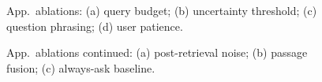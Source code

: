 \documentclass{article}
\begin{document}
\begin{figure}[h]
  \caption{App.\ ablations: (a) query budget; (b) uncertainty threshold; (c) question phrasing; (d) user patience.}
\end{figure}

\begin{figure}[h]
  \centering
  \caption{App.\ ablations continued: (a) post-retrieval noise; (b) passage fusion; (c) always-ask baseline.}
\end{figure}
\end{document}
